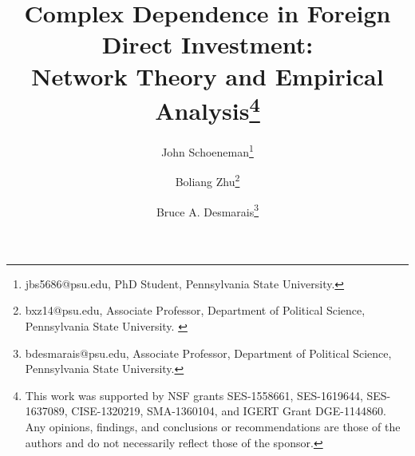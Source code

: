 \documentclass[reqno,onecolumn,letterpaper,12pt]{article}
\begin{document}
\title{Complex Dependence in Foreign Direct Investment: \\Network Theory and Empirical Analysis\footnote{This work was supported by NSF grants SES-1558661, SES-1619644,
 SES-1637089, CISE-1320219, SMA-1360104, and IGERT Grant DGE-1144860. Any opinions, findings, and conclusions or recommendations are those of the authors and
 do not necessarily reflect those of the sponsor.}}
\author{John  Schoeneman\thanks{\footnotesize{
jbs5686@psu.edu, PhD Student, Pennsylvania State University.}} \and Boliang Zhu\thanks{\footnotesize{bxz14@psu.edu, Associate Professor, Department of Political
Science, Pennsylvania State University. }} \and Bruce A. Desmarais\thanks{\footnotesize{
bdesmarais@psu.edu, Associate Professor, Department of Political Science, Pennsylvania State University.}}}
\date{}
\maketitle
\end{document}
